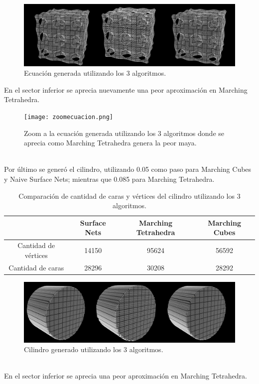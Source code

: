 \documentclass[12pt]{article}
\begin{document}
\clearpage
\begin{figure}[h!]
\includegraphics[width=\linewidth,center]{ecuacion2.png}
\caption{Ecuación generada utilizando los 3 algoritmos.}
\end{figure}
En el sector inferior se aprecia nuevamente una peor aproximación en Marching Tetrahedra.
\begin{figure}[h!]
\texttt{[image: zoomecuacion.png]}
\caption{Zoom a la ecuación generada utilizando los 3 algoritmos donde se aprecia como Marching Tetrahedra genera la peor maya.}
\end{figure}
\\Por último se generó el cilindro, utilizando 0.05 como paso para Marching Cubes y Naive Surface Nets; mientras que 0.085 para Marching Tetrahedra.
\begin{table}[h!]
  \centering
  \label{tab:table1}
  \begin{tabular}{cccc}
    \toprule
    & Surface Nets & Marching Tetrahedra & Marching Cubes\\
    \midrule
    Cantidad de vértices & 14150 &  95624 & 56592 \\
    Cantidad de caras &  28296 & 30208 & 28292 \\
    \bottomrule
  \end{tabular}
  \caption{Comparación de cantidad de caras y vértices del cilindro utilizando los 3 algoritmos.}
\end{table}
\begin{figure}[h!]
\includegraphics[width=\linewidth,center]{cilindro2.png}
\caption{Cilindro generado utilizando los 3 algoritmos.}
\end{figure}
\\En el sector inferior se aprecia una peor aproximación en Marching Tetrahedra.
\end{document}
